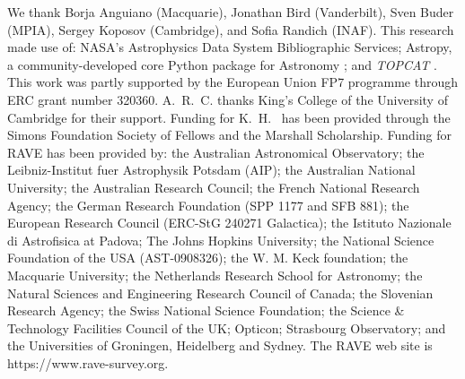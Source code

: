 \documentclass[preprint,trackchanges]{aastex}
\newcommand{\project}[1]{\textsl{#1}}
\begin{document}
\acknowledgements
We thank 
	Borja Anguiano (Macquarie),
	Jonathan Bird (Vanderbilt),
	Sven Buder (MPIA), 
	Sergey Koposov (Cambridge),
and 
	Sofia Randich (INAF).
This research made use of: 
  	NASA's Astrophysics Data System Bibliographic Services;
  	Astropy, a community-developed core Python package for Astronomy \citep{astropy};
and 
  	\project{TOPCAT} \citep{Taylor_2005}.
This work was partly supported by the European Union FP7 programme through ERC 
grant number 320360. A.~R.~C. thanks King's College of the University of Cambridge
for their support.  Funding for K.~H.~ has been provided through the Simons 
Foundation Society of Fellows and the Marshall Scholarship.
Funding for RAVE has been provided by: the Australian Astronomical Observatory; 
the Leibniz-Institut fuer Astrophysik Potsdam (AIP); the Australian National 
University; the Australian Research Council; the French National Research Agency;
the German Research Foundation (SPP 1177 and SFB 881); the European Research 
Council (ERC-StG 240271 Galactica); the Istituto Nazionale di Astrofisica at 
Padova; The Johns Hopkins University; the National Science Foundation of the USA
(AST-0908326); the W. M. Keck foundation; the Macquarie University; the 
Netherlands Research School for Astronomy; the Natural Sciences and Engineering 
Research Council of Canada; the Slovenian Research Agency; the Swiss National 
Science Foundation; the Science \& Technology Facilities Council of the UK; 
Opticon; Strasbourg Observatory; and the Universities of Groningen, Heidelberg 
and Sydney. The RAVE web site is https://www.rave-survey.org.  
\end{document}
